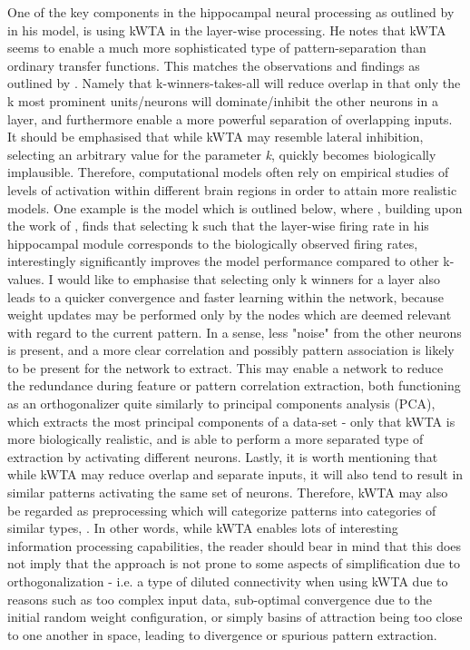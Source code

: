 One of the key components in the hippocampal neural processing as outlined by \cite{Hattori2014} in his model, is using kWTA in the layer-wise processing. He notes that kWTA seems to enable a much more sophisticated type of pattern-separation than ordinary transfer functions. This matches the observations and findings as outlined by \cite{Rolls1998chpt4, Rolls1998chpt6}. Namely that k-winners-takes-all will reduce overlap in that only the k most prominent units/neurons will dominate/inhibit the other neurons in a layer, and furthermore enable a more powerful separation of overlapping inputs. It should be emphasised that while kWTA may resemble lateral inhibition, selecting an arbitrary value for the parameter \textit{k}, quickly becomes biologically implausible. Therefore, computational models often rely on empirical studies of levels of activation within different brain regions in order to attain more realistic models. One example is the model which is outlined below, where \cite{Hattori2014}, building upon the work of \cite{Wakagi2008}, finds that selecting k such that the layer-wise firing rate in his hippocampal module corresponds to the biologically observed firing rates, interestingly significantly improves the model performance compared to other k-values. I would like to emphasise that selecting only k winners for a layer also leads to a quicker convergence and faster learning within the network, because weight updates may be performed only by the nodes which are deemed relevant with regard to the current pattern. In a sense, less "noise" from the other neurons is present, and a more clear correlation and possibly pattern association is likely to be present for the network to extract. This may enable a network to reduce the redundance during feature or pattern correlation extraction, both functioning as an orthogonalizer quite similarly to principal components analysis (PCA), which extracts the most principal components of a data-set - only that kWTA is more biologically realistic, and is able to perform a more separated type of extraction by activating different neurons.
Lastly, it is worth mentioning that while kWTA may reduce overlap and separate inputs, it will also tend to result in similar patterns activating the same set of neurons. Therefore, kWTA may also be regarded as preprocessing which will categorize patterns into categories of similar types, \citep{Rolls1998chpt1}. In other words, while kWTA enables lots of interesting information processing capabilities, the reader should bear in mind that this does not imply that the approach is not prone to some aspects of simplification due to orthogonalization - i.e. a type of diluted connectivity when using kWTA due to reasons such as too complex input data, sub-optimal convergence due to the initial random weight configuration, or simply basins of attraction being too close to one another in space, leading to divergence or spurious pattern extraction.

